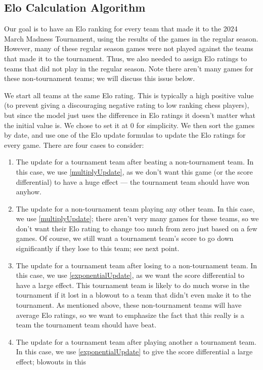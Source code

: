 \documentclass{article}
\begin{document}
\subsection{Elo Calculation Algorithm}
Our goal is to have an Elo ranking for every team that made it to the 2024 March Madness Tournament, using the results of the games in the regular season. However, many of these regular season games were not played against the teams that made it to the tournament. Thus, we also needed to assign Elo ratings to teams that did not play in the regular season. Note there aren't many games for these non-tournament teams; we will discuss this issue below. 

We start all teams at the same Elo rating. This is typically a high positive value (to prevent giving a discouraging negative rating to low ranking chess players), but since the model just uses the difference in Elo ratings it doesn't matter what the initial value is. We chose to set it at 0 for simplicity. We then sort the games by date, and use one of the Elo update formulas to update the Elo ratings for every game. There are four cases to consider:

\begin{enumerate}
    \item The update for a tournament team after beating a non-tournament team. In this case, we use \autoref{multiplyUpdate}, as we don't want this game (or the score differential) to have a huge effect --- the tournament team should have won anyhow.
    \item The update for a non-tournament team playing any other team. In this case, we use \autoref{multiplyUpdate}; there aren't very many games for these teams, so we don't want their Elo rating to change too much from zero just based on a few games. Of course, we still want a tournament team's score to go down significantly if they lose to this team; see next point.
    \item The update for a tournament team after losing to a non-tournament team. In this case, we use \autoref{exponentialUpdate}, as we want the score differential to have a large effect. This tournament team is likely to do much worse in the tournament if it lost in a blowout to a team that didn't even make it to the tournament. As mentioned above, these non-tournament teams will have average Elo ratings, so we want to emphasize the fact that this really is a team the tournament team should have beat.
    \item The update for a tournament team after playing another a tournament team. In this case, we use \autoref{exponentialUpdate} to give the score differential a large effect; blowouts in this 
\end{enumerate}
\end{document}
